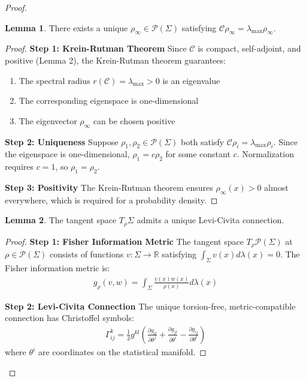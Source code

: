 \documentclass[11pt]{article}
\theoremstyle{definition}
\newtheorem{lemma}{Lemma}[section]
\newcommand{\coherence}{\mathcal{C}}
\newcommand{\configspace}{\Sigma}
\newcommand{\density}{\rho}
\newcommand{\eigenvalue}{\lambda}
\begin{document}
\begin{proof}
\begin{lemma}
There exists a unique $\density_\infty \in \mathcal{P}(\configspace)$ satisfying $\coherence\density_\infty = \eigenvalue_{\max} \density_\infty$.
\end{lemma}
\begin{proof}
\textbf{Step 1: Krein-Rutman Theorem}
Since $\coherence$ is compact, self-adjoint, and positive (Lemma 2), the Krein-Rutman theorem guarantees:
\begin{enumerate}
\item The spectral radius $r(\coherence) = \eigenvalue_{\max} > 0$ is an eigenvalue
\item The corresponding eigenspace is one-dimensional
\item The eigenvector $\density_\infty$ can be chosen positive
\end{enumerate}

\textbf{Step 2: Uniqueness}
Suppose $\density_1, \density_2 \in \mathcal{P}(\configspace)$ both satisfy $\coherence\density_i = \eigenvalue_{\max} \density_i$. Since the eigenspace is one-dimensional, $\density_1 = c \density_2$ for some constant $c$. Normalization requires $c = 1$, so $\density_1 = \density_2$.

\textbf{Step 3: Positivity}
The Krein-Rutman theorem ensures $\density_\infty(x) > 0$ almost everywhere, which is required for a probability density.
\end{proof}

\begin{lemma}
The tangent space $T_\density\configspace$ admits a unique Levi-Civita connection.
\end{lemma}
\begin{proof}
\textbf{Step 1: Fisher Information Metric}
The tangent space $T_\density\mathcal{P}(\configspace)$ at $\density \in \mathcal{P}(\configspace)$ consists of functions $v: \configspace \to \mathbb{R}$ satisfying $\int_{\configspace} v(x) d\lambda(x) = 0$. The Fisher information metric is:
\begin{align}
g_\density(v,w) = \int_{\configspace} \frac{v(x) w(x)}{\density(x)} d\lambda(x)
\end{align}

\textbf{Step 2: Levi-Civita Connection}
The unique torsion-free, metric-compatible connection has Christoffel symbols:
\begin{align}
\Gamma_{ij}^k = \frac{1}{2} g^{kl} \left( \frac{\partial g_{il}}{\partial \theta^j} + \frac{\partial g_{jl}}{\partial \theta^i} - \frac{\partial g_{ij}}{\partial \theta^l} \right)
\end{align}
where $\theta^i$ are coordinates on the statistical manifold.


\end{proof}
\end{proof}
\end{document}
